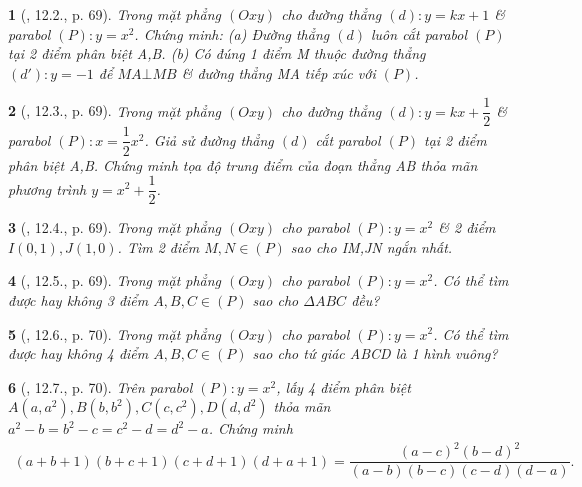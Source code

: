 \documentclass{article}
\newtheorem{baitoan}{}
\begin{document}
\begin{baitoan}[\cite{TLCT_THCS_Toan_9_dai_so}, 12.2., p. 69]
	Trong mặt phẳng $(Oxy)$ cho đường thẳng $(d):y = kx + 1$ \& parabol $(P):y = x^2$. Chứng minh: (a) Đường thẳng $(d)$ luôn cắt parabol $(P)$ tại 2 điểm phân biệt A,B. (b) Có đúng 1 điểm M thuộc đường thẳng $(d'):y = -1$ để $MA\bot MB$ \& đường thẳng MA tiếp xúc với $(P)$.
\end{baitoan}

\begin{baitoan}[\cite{TLCT_THCS_Toan_9_dai_so}, 12.3., p. 69]
	Trong mặt phẳng $(Oxy)$ cho đường thẳng $(d):y = kx + \dfrac{1}{2}$ \& parabol $(P):x = \dfrac{1}{2}x^2$. Giả sử đường thẳng $(d)$ cắt parabol $(P)$ tại 2 điểm phân biệt A,B. Chứng minh tọa độ trung điểm của đoạn thẳng AB thỏa mãn phương trình $y = x^2 + \dfrac{1}{2}$.
\end{baitoan}

\begin{baitoan}[\cite{TLCT_THCS_Toan_9_dai_so}, 12.4., p. 69]
	Trong mặt phẳng $(Oxy)$ cho parabol $(P): y = x^2$ \& 2 điểm $I(0,1),J(1,0)$. Tìm 2 điểm $M,N\in(P)$ sao cho IM,JN ngắn nhất.
\end{baitoan}

\begin{baitoan}[\cite{TLCT_THCS_Toan_9_dai_so}, 12.5., p. 69]
	Trong mặt phẳng $(Oxy)$ cho parabol $(P): y = x^2$. Có thể tìm được hay không 3 điểm $A,B,C\in(P)$ sao cho $\Delta ABC$ đều?
\end{baitoan}

\begin{baitoan}[\cite{TLCT_THCS_Toan_9_dai_so}, 12.6., p. 70]
	Trong mặt phẳng $(Oxy)$ cho parabol $(P): y = x^2$. Có thể tìm được hay không 4 điểm $A,B,C\in(P)$ sao cho tứ giác ABCD là 1 hình vuông?
\end{baitoan}

\begin{baitoan}[\cite{TLCT_THCS_Toan_9_dai_so}, 12.7., p. 70]
	Trên parabol $(P): y = x^2$, lấy 4 điểm phân biệt $A(a,a^2),B(b,b^2),C(c,c^2),D(d,d^2)$ thỏa mãn $a^2 - b = b^2 - c = c^2 - d = d^2 - a$. Chứng minh
	\begin{align*}
		(a + b + 1)(b + c + 1)(c + d + 1)(d + a + 1) = \dfrac{(a - c)^2(b - d)^2}{(a - b)(b - c)(c - d)(d - a)}.
	\end{align*}
\end{baitoan}

\end{document}
